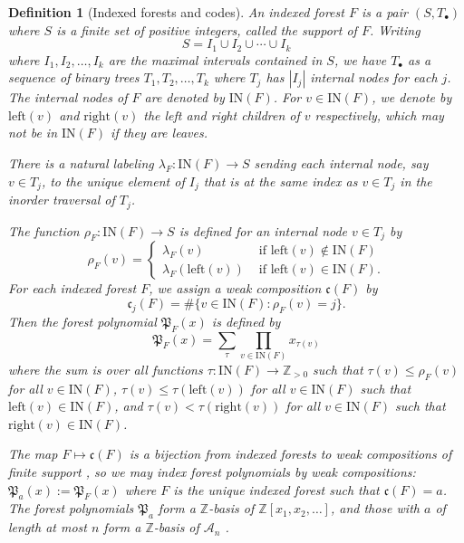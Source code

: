 \documentclass[pdflatex,sn-mathphys-num]{sn-jnl}
\numberwithin{equation}{subsection}
\newcommand{\coma}{\mathcal{A}}
\newcommand{\code}{\mathfrak{c}}
\newcommand{\forest}{\mathfrak{P}}
\theoremstyle{thmstyleone}
\theoremstyle{thmstylethree}
\newtheorem{definition}[lemma]{Definition}
\theoremstyle{thmstyletwo}
\begin{document}
\begin{definition}[Indexed forests and codes]
  An \emph{indexed forest} $F$ is a pair $(S, T_\bullet)$ where $S$ is a finite set of positive integers, called the \emph{support} of $F$. Writing
  $$S=I_1\cup I_2\cup \cdots \cup I_k$$
  where $I_1,I_2,\ldots, I_k$ are the maximal intervals contained in $S$, we have $T_\bullet$ as a sequence of binary trees $T_1,T_2,\ldots, T_k$ where $T_j$ has $|I_j|$ internal nodes for each $j$. The internal nodes of $F$ are denoted by $\mathrm{IN}(F)$. For $v\in \mathrm{IN}(F)$, we denote by $\mathrm{left}(v)$ and $\mathrm{right}(v)$ the left and right children of $v$ respectively, which may not be in $\mathrm{IN}(F)$ if they are leaves.
  
  There is a natural labeling $\lambda_F:\mathrm{IN}(F)\to S$ sending each internal node, say $v\in T_j$, to the unique element of $I_j$ that is at the same index as $v\in T_j$ in the inorder traversal of $T_j$.
  
  The function $\rho_F:\mathrm{IN}(F)\to S$ is defined for an internal node $v\in T_j$ by 
  $$\rho_F(v) = \begin{cases}
  \lambda_F(v)&\mbox{ if }\mathrm{left}(v)\notin\mathrm{IN}(F)\\
  \lambda_F(\mathrm{left}(v))&\mbox{ if }\mathrm{left}(v)\in\mathrm{IN}(F).
  \end{cases}$$
  For each indexed forest $F$, we assign a weak composition $\code(F)$ by
  $$\code_j(F)=\#\{v\in \mathrm{IN}(F): \rho_F(v)=j\}.$$
  Then the \emph{forest polynomial} $\forest_F(x)$ is defined by
  $$\forest_F(x) = \sum_{\tau}\prod_{v\in\mathrm{IN}(F)}x_{\tau(v)}$$
  where the sum is over all functions $\tau:\mathrm{IN}(F)\to \mathbb{Z}_{>0}$ such that $\tau(v)\leq \rho_F(v)$ for all $v\in \mathrm{IN}(F)$, $\tau(v)\leq\tau(\mathrm{left}(v))$ for all $v\in \mathrm{IN}(F)$ such that $\mathrm{left}(v)\in \mathrm{IN}(F)$, and $\tau(v)<\tau(\mathrm{right}(v))$ for all $v\in \mathrm{IN}(F)$ such that $\mathrm{right}(v)\in \mathrm{IN}(F)$.

  The map $F\mapsto\code(F)$ is a bijection from indexed forests to weak compositions of finite support \cite{nadeau2024forest}, so we may index forest polynomials by weak compositions: $\forest_a(x) := \forest_F(x)$ where $F$ is the unique indexed forest such that $\code(F) = a$. The forest polynomials $\forest_a$ form a $\mathbb{Z}$-basis of $\mathbb{Z}[x_1,x_2,\ldots]$, and those with $a$ of length at most $n$ form a $\mathbb{Z}$-basis of $\coma_n$ \cite{nadeau2024forest}.
\end{definition}
\end{document}
